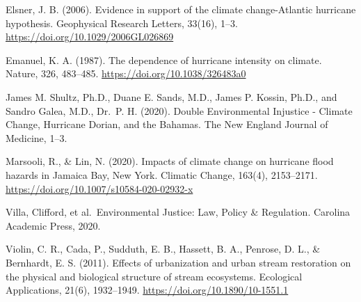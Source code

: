 \documentclass[
  12pt,
]{article}
\begin{document}
Elsner, J. B. (2006). Evidence in support of the climate change-Atlantic
hurricane hypothesis. Geophysical Research Letters, 33(16), 1--3.
\url{https://doi.org/10.1029/2006GL026869}

Emanuel, K. A. (1987). The dependence of hurricane intensity on climate.
Nature, 326, 483--485. \url{https://doi.org/10.1038/326483a0}

James M. Shultz, Ph.D., Duane E. Sands, M.D., James P. Kossin, Ph.D.,
and Sandro Galea, M.D., Dr.~P. H. (2020). Double Environmental Injustice
- Climate Change, Hurricane Dorian, and the Bahamas. The New England
Journal of Medicine, 1--3.

Marsooli, R., \& Lin, N. (2020). Impacts of climate change on hurricane
flood hazards in Jamaica Bay, New York. Climatic Change, 163(4),
2153--2171. \url{https://doi.org/10.1007/s10584-020-02932-x}

Villa, Clifford, et al.~Environmental Justice: Law, Policy \&
Regulation. Carolina Academic Press, 2020.

Violin, C. R., Cada, P., Sudduth, E. B., Hassett, B. A., Penrose, D. L.,
\& Bernhardt, E. S. (2011). Effects of urbanization and urban stream
restoration on the physical and biological structure of stream
ecosystems. Ecological Applications, 21(6), 1932--1949.
\url{https://doi.org/10.1890/10-1551.1}
\end{document}
